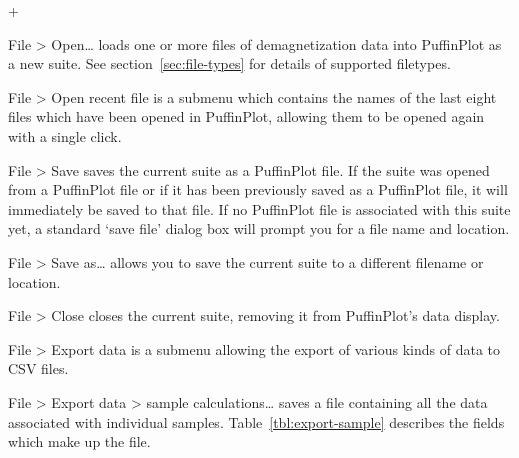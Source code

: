 \documentclass[a4paper,british]{article}
\newcommand{\menuitemlabel}[1]{%
\mbox{\textsf{#1}}\hfil}
\newenvironment{menuitemlist}%
{\begin{list}{}{%
\renewcommand{\makelabel}{\menuitemlabel}%
\setlength{\labelwidth}{35pt}%
\setlength{\leftmargin}%
             {\labelwidth+\labelsep}}}%
{\end{list}}
\newcommand{\caps}[1]{\MakeTextUppercase{#1}} %
\newcommand{\submenu}{ \textgreater{} } %
\begin{document}
\begin{menuitemlist}

\item[File\submenu Open\ldots] loads one or more files of demagnetization
  data into PuffinPlot as a new suite. See
  section~\ref{sec:file-types} for details of supported filetypes.

\item[File\submenu Open recent file] is a submenu which
contains the names of the last eight files which have been opened in
PuffinPlot, allowing them to be opened again with a single click.

\item[File\submenu Save] saves the current suite as a PuffinPlot file. If
the suite was opened from a PuffinPlot file or if it has been previously
saved as a PuffinPlot file, it will immediately be saved to that file. If no
PuffinPlot file is associated with this suite yet, a standard ‘save file’
dialog box will prompt you for a file name and location.

\item[File\submenu Save as\ldots] allows you to save the current suite to a
different filename or location.

\item[File\submenu Close] closes the current suite, removing it from
PuffinPlot's data display.

\item[File\submenu Export data] is a submenu allowing the export of
various kinds of data to \caps{csv} files.

\item[File\submenu Export data\submenu sample calculations\ldots] saves a file
containing all the data associated with individual samples.
Table~\ref{tbl:export-sample} describes the fields which make
up the file.


\end{menuitemlist}
\end{document}
